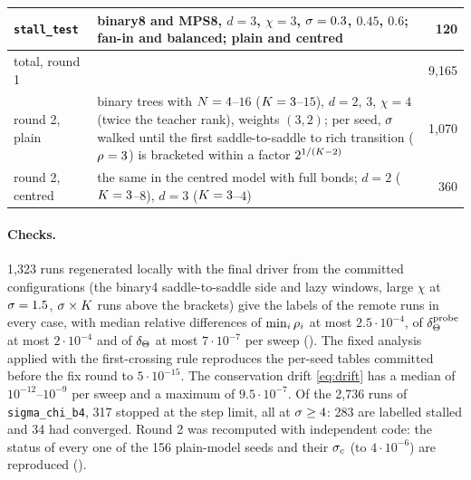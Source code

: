 \begin{table}[ht]
\begin{tabularx}{\textwidth}{@{}>{\raggedright\arraybackslash}p{3.0cm}X r@{}}
    \texttt{stall\_test} & binary8 and MPS8, $d=3$, $\chi=3$, $\sigma=0.3$, $0.45$, $0.6$; fan-in and balanced;
      plain and centred & 120 \\
    \midrule
    total, round 1 & & 9,165 \\
    \midrule
    round 2, plain & binary trees with $N=4$--$16$ ($K=3$--$15$), $d=2$, $3$, $\chi=4$ (twice the teacher rank),
      weights $(3,2)$; per seed, $\sigma$ walked until the first saddle-to-saddle to rich transition ($\rho_{}=3$) is
      bracketed within a factor $2^{1/(K-2)}$ & 1,070 \\
    round 2, centred & the same in the centred model with full bonds; $d=2$ ($K=3$--$8$), $d=3$ ($K=3$--$4$) & 360 \\
    \bottomrule
  \end{tabularx}
\end{table}

\paragraph{Checks.}
1,323 runs regenerated locally with the final driver from the committed configurations (the binary4
saddle-to-saddle side and lazy windows, large $\chi$ at $\sigma=1.5$, $\sigma\times K$ runs above the brackets) give the
labels of the remote runs in every case, with median relative differences of $\min_i\rho_{i}$ at most
$2.5\cdot10^{-4}$, of $\delta_{\Theta}^{\rm probe}$ at most $2\cdot10^{-4}$ and of $\delta_{\Theta}$ at most $7\cdot10^{-7}$ per sweep
(). The fixed analysis applied with the first-crossing rule
reproduces the per-seed tables committed before the fix round to $5\cdot10^{-15}$. The conservation drift
\eqref{eq:drift} has a median of $10^{-12}$--$10^{-9}$ per sweep and a maximum of $9.5\cdot10^{-7}$. Of the 2,736
runs of \texttt{sigma\_chi\_b4}, 317 stopped at the step limit, all at $\sigma\ge4$: 283 are labelled stalled and 34
had converged. Round 2 was recomputed with independent code: the status of every one of the 156 plain-model
seeds and their $\sigma_c$ (to $4\cdot10^{-6}$) are reproduced ().

